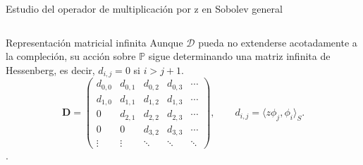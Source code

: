 \documentclass[aspectratio=169,10pt]{beamer}
\newcommand{\Poly}{\mathbb{P}}
\newcommand{\D}{\mathcal{D}}
\begin{document}
\begin{frame}{Estudio del operador de multiplicación por z en Sobolev general}
\begin{columns}[T,onlytextwidth]
    \begin{alertblock}{Representación matricial infinita}
      Aunque \(\D\) pueda no extenderse acotadamente a la compleción, su acción sobre
      \(\Poly\) sigue determinando una matriz infinita de Hessenberg, es decir,
      \(d_{i,j}=0\) si \(i>j+1\).
        {\setlength{\arraycolsep}{2.5pt}
          \[
            \mathbf D=
            \begin{pmatrix}
              d_{0,0} & d_{0,1} & d_{0,2} & d_{0,3} & \cdots \\
              d_{1,0} & d_{1,1} & d_{1,2} & d_{1,3} & \cdots \\
              0       & d_{2,1} & d_{2,2} & d_{2,3} & \cdots \\
              0       & 0       & d_{3,2} & d_{3,3} & \cdots \\
              \vdots  & \vdots  & \ddots  & \ddots  & \ddots
            \end{pmatrix},
            \qquad
            d_{i,j}=\langle z\phi_j,\phi_i\rangle_S.
          \]
        }
        {\scriptsize \cite{EGT23,EG25-2}.}
    \end{alertblock}
  \end{columns}
\end{frame}
\end{document}
